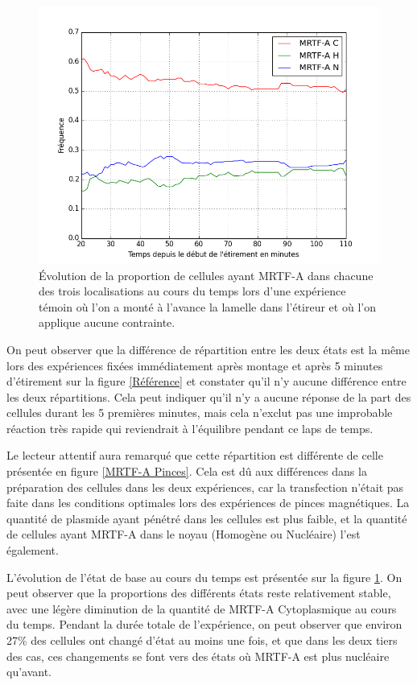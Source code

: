 \documentclass{report}
\begin{document}
\begin{figure}
\includegraphics[scale=0.4]{Figures/CHN_vs_Temps_reference.png} 
\caption{\label{Reference_dynamique} \'E{}volution de la proportion de cellules ayant MRTF-A dans chacune des trois localisations au cours du temps lors d'une expérience témoin où l'on a monté à l'avance la lamelle dans l'étireur et où l'on applique aucune contrainte.}
\end{figure}

On peut observer que la différence de répartition entre les deux états est la même lors des expériences fixées immédiatement après montage et après 5 minutes d'étirement sur la figure \ref{Référence} et constater qu'il n'y aucune différence entre les deux répartitions.
Cela peut indiquer qu'il n'y a aucune réponse de la part des cellules durant les 5 premières minutes, mais cela n'exclut pas une improbable réaction très rapide qui reviendrait à l'équilibre pendant ce laps de temps. 

Le lecteur attentif aura remarqué que cette répartition est différente de celle présentée en figure \ref{MRTF-A Pinces}. 
Cela est dû aux différences dans la préparation des cellules dans les deux expériences, car la transfection n'était pas faite dans les conditions optimales lors des expériences de pinces magnétiques. 
La quantité de plasmide ayant pénétré dans les cellules est plus faible, et la quantité de cellules ayant MRTF-A dans le noyau (Homogène ou Nucléaire) l'est également. 


L'évolution de l'état de base au cours du temps est présentée sur la figure \ref{Reference_dynamique}. On peut observer que la proportions des différents états reste relativement stable, avec une légère diminution de la quantité de MRTF-A Cytoplasmique au cours du temps. 
Pendant la durée totale de l'expérience, on peut observer que environ 27\% des cellules ont changé d'état au moins une fois, et que dans les deux tiers des cas, ces changements se font vers des états où MRTF-A est plus nucléaire qu'avant. 
\end{document}
